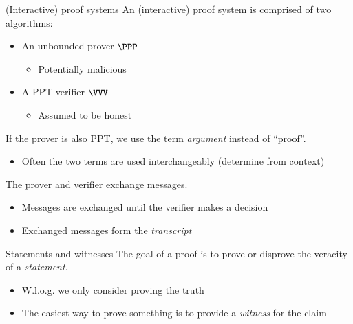 \begin{frame}{(Interactive) proof systems}
  An (interactive) proof system is comprised of two algorithms:
  \begin{itemize}[<+(1)->]
    \item An unbounded prover $\PPP$
    \begin{itemize}
      \item Potentially malicious
    \end{itemize}
    \item A PPT verifier $\VVV$
    \begin{itemize}
      \item Assumed to be honest
    \end{itemize}
  \end{itemize}

  \vspace*{1em}
  
  \pause
  If the prover is also PPT, we use the term \emph{argument} instead of \enquote{proof}.
  \begin{itemize}[<+(1)->]
    \item Often the two terms are used interchangeably (determine from context)
  \end{itemize}

  \vspace*{1em}

  \pause
  The prover and verifier exchange messages.
  \begin{itemize}[<+(1)->]
    \item Messages are exchanged until the verifier makes a decision
    \item Exchanged messages form the \emph{transcript}
  \end{itemize}
\end{frame}

\begin{frame}{Statements and witnesses}
  \pause
  The goal of a proof is to prove or disprove the veracity of a \emph{statement}.
  \begin{itemize}[<+(1)->]
    \item W.l.o.g. we only consider proving the truth
    \item The easiest way to prove something is to provide a \emph{witness} for the claim
  \end{itemize}
\end{frame}

